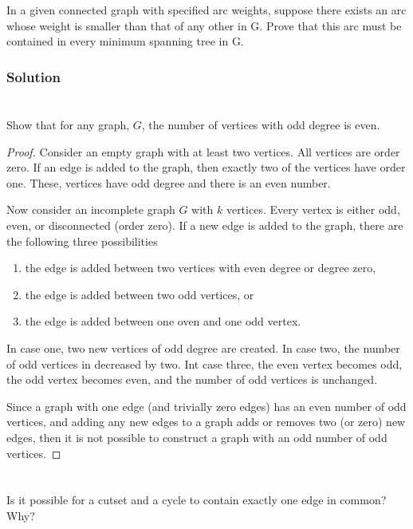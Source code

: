 \documentclass{amsart}
\begin{document}
\section{}
In a given connected graph with specified arc weights, suppose there exists an arc whose
weight is smaller than that of any other in G. Prove that this arc must be contained in every
minimum spanning tree in G.
\subsubsection*{Solution}

\section{}
Show that for any graph, $G$, the number of vertices with odd degree is even.
\begin{proof}
  Consider an empty graph with at least two vertices.
  All vertices are order zero.
  If an edge is added to the graph, then exactly two of the vertices have order
  one.
  These, vertices have odd degree and there is an even number.

  Now consider an incomplete graph $G$ with $k$ vertices.
  Every vertex is either odd, even, or disconnected (order zero).
  If a new edge is added to the graph, there are the following three
  possibilities
  \begin{enumerate}
  \item the edge is added between two vertices with even degree or degree zero,
  \item the edge is added between two odd vertices, or
  \item the edge is added between one oven and one odd vertex.
  \end{enumerate}
  In case one, two new vertices of odd degree are created.
  In case two, the number of odd vertices in decreased by two.
  Int case three, the even vertex becomes odd, the odd vertex becomes even, and
  the number of odd vertices is unchanged.

  Since a graph with one edge (and trivially zero edges) has an even number of
  odd vertices, and adding any new edges to a graph adds or removes two (or
  zero) new edges, then it is not possible to construct a graph with an odd
  number of odd vertices.
\end{proof}

\section{}
Is it possible for a cutset and a cycle to contain exactly one edge in common? Why?
\end{document}
